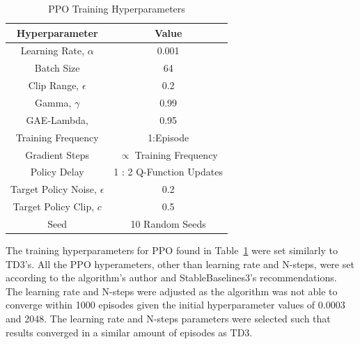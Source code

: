 \documentclass[10pt,twocolumn,letterpaper]{article}
\begin{document}
%
%
\begin{table}[t]
        \caption{PPO Training Hyperparameters}
        \vspace{-4mm}
        \label{tab:training_hyperameters_PPO}
        \begin{center}
        \begin{tabular}{|c||c|}
        \hline
        Hyperparameter                  & Value                           \\
        \hline
        Learning Rate, $\alpha$         & 0.001                           \\
        Batch Size                      & 64                              \\
        Clip Range, $\epsilon $         & 0.2                             \\
        Gamma, $\gamma$                 & 0.99                            \\
        GAE-Lambda,                     & 0.95                            \\
        Training Frequency              & 1:Episode                       \\
        Gradient Steps                  & $\propto$ Training Frequency    \\
        Policy Delay                    & 1 : 2 Q-Function Updates        \\
        Target Policy Noise, $\epsilon$ & 0.2                             \\
        Target Policy Clip, $c$         & 0.5                             \\
        Seed                            & 10 Random Seeds                 \\
        \hline
        \end{tabular}
        \end{center}
        \vspace{-5mm}
\end{table}
%

The training hyperparameters for PPO found in Table~\ref{tab:training_hyperameters_PPO} were set similarly to TD3's. All the PPO hyperameters, other than learning rate and N-steps, were set according to the algorithm's author and StableBaselines3's recommendations.
The learning rate and N-steps were adjusted as the algorithm was not able to converge within 1000 episodes given the initial hyperparameter values of 0.0003 and 2048. The learning rate and N-steps parameters were selected such that results converged in a similar amount of
episodes as TD3.
\end{document}
